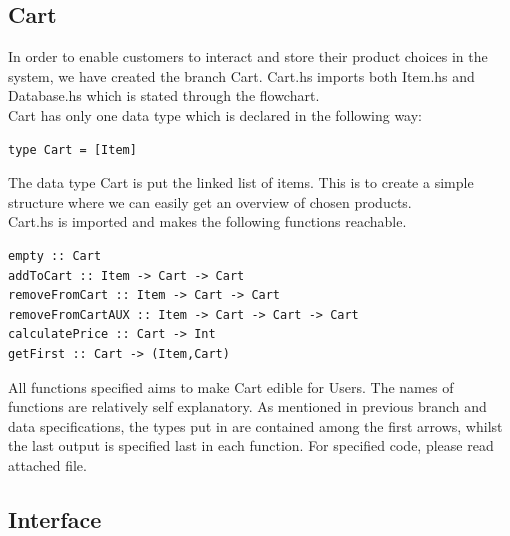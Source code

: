 \documentclass[11pt]{article}
\begin{document}
\subsection{Cart}
In order to enable customers to interact and store their product choices in the system, we have created the branch Cart. Cart.hs imports both Item.hs and Database.hs which is stated through the flowchart.\\
Cart has only one data type which is declared in the following way:\\
\begin{lstlisting}
type Cart = [Item]
\end{lstlisting}
The data type Cart is put the linked list of items. This is to create a simple structure where we can easily get an overview of chosen products.\\
Cart.hs is imported and makes the following functions reachable.\\
\begin{lstlisting}
empty :: Cart
addToCart :: Item -> Cart -> Cart
removeFromCart :: Item -> Cart -> Cart
removeFromCartAUX :: Item -> Cart -> Cart -> Cart
calculatePrice :: Cart -> Int
getFirst :: Cart -> (Item,Cart)
\end{lstlisting}
All functions specified aims to make Cart edible for Users. The names of functions are relatively self explanatory. As mentioned in previous branch and data specifications, the types put in are contained among the first arrows, whilst the last output is specified last in each function. For specified code, please read attached file.
\newpage
\subsection{Interface}
\end{document}
